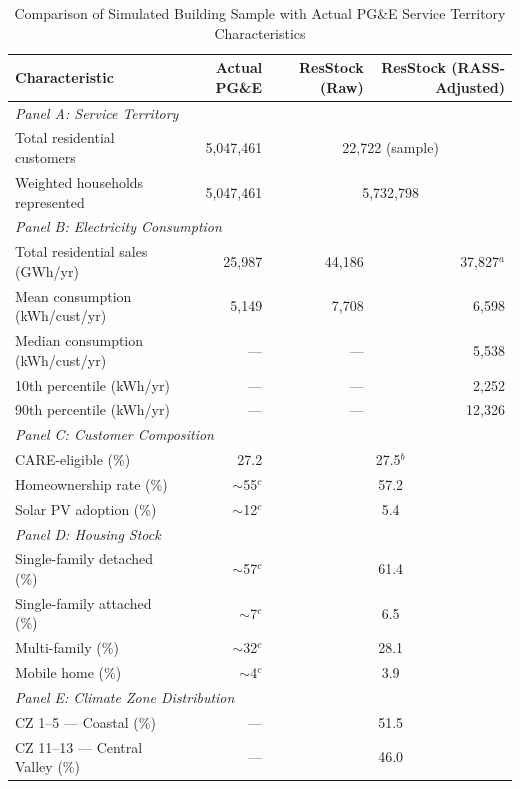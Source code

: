 \begin{table}[htbp]
\centering
\caption{Comparison of Simulated Building Sample with Actual PG\&E Service Territory Characteristics}
\label{tab:sample_comparison_pge}
\begin{tabular}{lrrr}
\toprule
\textbf{Characteristic} & \textbf{Actual PG\&E} & \textbf{ResStock (Raw)} & \textbf{ResStock (RASS-Adjusted)} \\
\midrule
\multicolumn{4}{l}{\textit{Panel A: Service Territory}} \\
Total residential customers & 5,047,461 & \multicolumn{2}{c}{22,722 (sample)} \\
Weighted households represented & 5,047,461 & \multicolumn{2}{c}{5,732,798} \\
\midrule
\multicolumn{4}{l}{\textit{Panel B: Electricity Consumption}} \\
Total residential sales (GWh/yr) & 25,987 & 44,186 & 37,827$^a$ \\
Mean consumption (kWh/cust/yr) & 5,149 & 7,708 & 6,598 \\
Median consumption (kWh/cust/yr) & --- & --- & 5,538 \\
10th percentile (kWh/yr) & --- & --- & 2,252 \\
90th percentile (kWh/yr) & --- & --- & 12,326 \\
\midrule
\multicolumn{4}{l}{\textit{Panel C: Customer Composition}} \\
CARE-eligible (\%) & 27.2 & \multicolumn{2}{c}{27.5$^b$} \\
Homeownership rate (\%) & $\sim$55$^c$ & \multicolumn{2}{c}{57.2} \\
Solar PV adoption (\%) & $\sim$12$^c$ & \multicolumn{2}{c}{5.4} \\
\midrule
\multicolumn{4}{l}{\textit{Panel D: Housing Stock}} \\
Single-family detached (\%) & $\sim$57$^c$ & \multicolumn{2}{c}{61.4} \\
Single-family attached (\%) & $\sim$7$^c$ & \multicolumn{2}{c}{6.5} \\
Multi-family (\%) & $\sim$32$^c$ & \multicolumn{2}{c}{28.1} \\
Mobile home (\%) & $\sim$4$^c$ & \multicolumn{2}{c}{3.9} \\
\midrule
\multicolumn{4}{l}{\textit{Panel E: Climate Zone Distribution}} \\
CZ 1--5 --- Coastal (\%) & --- & \multicolumn{2}{c}{51.5} \\
CZ 11--13 --- Central Valley (\%) & --- & \multicolumn{2}{c}{46.0} \\

\end{tabular}
\end{table}
